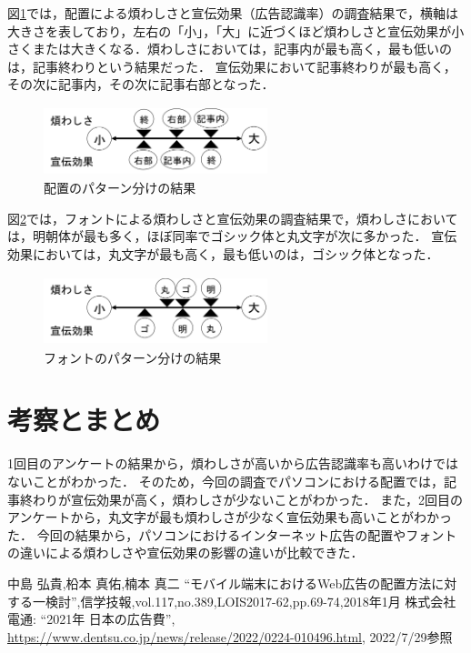 \documentclass[twocolumn,10pt,a4j]{ltjsarticle}
\begin{document}
図\ref{fig:結果1}では，配置による煩わしさと宣伝効果（広告認識率）の調査結果で，横軸は大きさを表しており，左右の「小」，「大」に近づくほど煩わしさと宣伝効果が小さくまたは大きくなる．煩わしさにおいては，記事内が最も高く，最も低いのは，記事終わりという結果だった．
宣伝効果において記事終わりが最も高く，その次に記事内，その次に記事右部となった．

\begin{figure}[h]
\begin{center}
 \includegraphics[clip,width=65mm,height=20mm]{結果1.png}
\end{center}
 \caption{配置のパターン分けの結果}
 \label{fig:結果1}
\end{figure}

図\ref{fig:結果2}では，フォントによる煩わしさと宣伝効果の調査結果で，煩わしさにおいては，明朝体が最も多く，ほぼ同率でゴシック体と丸文字が次に多かった．
宣伝効果においては，丸文字が最も高く，最も低いのは，ゴシック体となった．
\begin{figure}[h]
\begin{center}
 \includegraphics[clip,width=65mm,height=20mm]{結果2.png}
\end{center}
 \caption{フォントのパターン分けの結果}
 \label{fig:結果2}
\end{figure}

\section{考察とまとめ}
1回目のアンケートの結果から，煩わしさが高いから広告認識率も高いわけではないことがわかった．
そのため，今回の調査でパソコンにおける配置では，記事終わりが宣伝効果が高く，煩わしさが少ないことがわかった．
また，2回目のアンケートから，丸文字が最も煩わしさが少なく宣伝効果も高いことがわかった．
今回の結果から，パソコンにおけるインターネット広告の配置やフォントの違いによる煩わしさや宣伝効果の影響の違いが比較できた．

\begin{thebibliography}{99}
 中島 弘貴,柗本 真佑,楠本 真二 ``モバイル端末におけるWeb広告の配置方法に対する一検討'',信学技報,vol.117,no.389,LOIS2017-62,pp.69-74,2018年1月
 株式会社電通: ``2021年 日本の広告費'', \url{https://www.dentsu.co.jp/news/release/2022/0224-010496.html}, 2022/7/29参照
\end{thebibliography}
\end{document}
